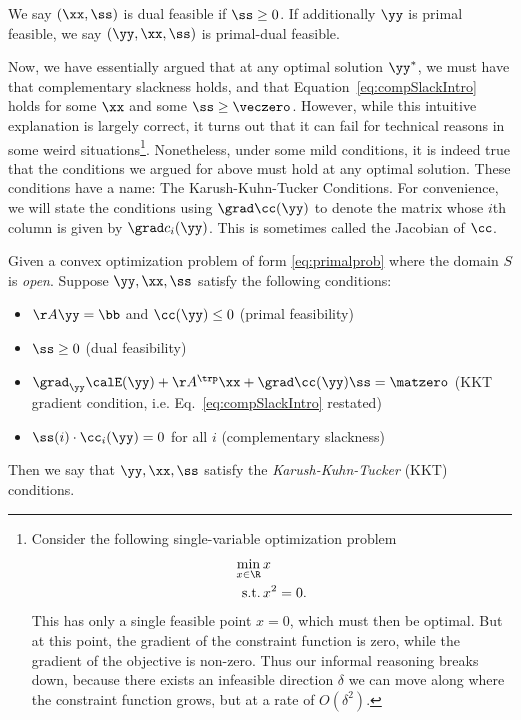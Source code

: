 \begin{definition}
We say $(\xx, \ss)$ is dual feasible if $\ss \geq 0$.
If additionally $\yy$ is primal feasible, we say $(\yy, \xx, \ss)$ is primal-dual feasible.
\end{definition}

Now, we have essentially argued that at any optimal solution
$\yy^*$, we must have that complementary slackness holds, and that
Equation~\eqref{eq:compSlackIntro} holds for some $\xx$ and some $\ss
\geq \veczero$.
However, while this intuitive explanation is largely correct, it turns
out that it can fail for technical reasons in some weird
situations\footnote{
  Consider the following single-variable optimization problem
  \begin{align*}
    \min_{x
    \in \R} &\, x
    \\
    \text{s.t.} & \, x^2 = 0.
  \end{align*}
  This has only a single feasible point $x = 0$, which must then be
  optimal.
  But at this point, the gradient of the constraint function is zero,
  while the gradient of the objective is non-zero.
  Thus our informal reasoning breaks down, because there exists an infeasible
  direction $\delta$ we can move along where the constraint function grows, but
  at a rate of $O(\delta^2)$.
  }.
Nonetheless, under some mild conditions, it is indeed true that the 
conditions we argued for above must hold at any optimal solution.
These conditions have a name: The Karush-Kuhn-Tucker Conditions.
For convenience, we will state the conditions using $\grad \cc(\yy)$
to denote the matrix whose $i$th column is given by $\grad c_i(\yy)$.
This is sometimes called the Jacobian of $\cc$.

\begin{definition}
  Given a convex optimization problem of form
  \eqref{eq:primalprob} where the domain $S$ is \emph{open}.
  Suppose $\yy, \xx, \ss$ satisfy the following conditions:
  \begin{itemize}
  \item $\AA\yy = \bb$ and $\cc(\yy) \leq 0$ \hfill (primal feasibility)
  \item $\ss \geq 0$ \hfill (dual feasibility)
  \item $\grad_{\yy}\calE(\yy) + \AA^\trp\xx +
    \grad\cc(\yy) \ss = \matzero$ \hfill
    (KKT gradient condition, i.e. Eq.~\eqref{eq:compSlackIntro} restated)
  \item $\ss(i)\cdot\cc_i(\yy) = 0$ for all $i$ \hfill (complementary slackness)
  \end{itemize}
  Then we say that $\yy, \xx, \ss$ satisfy the  \emph{Karush-Kuhn-Tucker} (KKT) conditions.
\end{definition}

